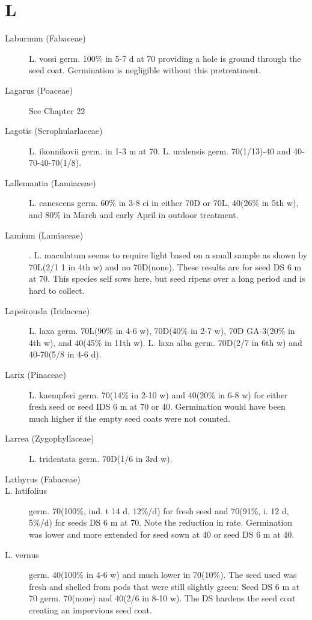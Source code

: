 \section{L}
\begin{description}

\item[Laburnum (Fabaceae)] L. vossi germ. 100\% in 5-7 d at 70 providing a hole
is ground through the seed coat. Germination is negligible without this pretreatment.

\item[Lagarus (Poaceae)] See Chapter 22
\item[Lagotis (Scrophularlaceae)] L. ikonnikovii germ. in 1-3 m at 70. L.
uralensis germ. 70(1/13)-40 and 40-70-40-70(1/8).
\item[Lallemantia (Lamiaceae)] L. canescens germ. 60\% in 3-8 ci in either 70D
or 70L, 40(26\% in 5th w), and 80\% in March and early April in outdoor treatment.
\item[Lamium (Lamiaceae)]. L. maculatum seems to require light based on a
small sample as shown by 70L(2/1 1 in 4th w) and no 70D(none). These results are for
seed DS 6 m at 70. This species self sows here, but seed ripens over a long period
and is hard to collect.
\item[Lapeirousla (Iridaceae)] L. laxa germ. 70L(90\% in 4-6 w), 70D(40\% in 2-7
w), 70D GA-3(20\% in 4th w), and 40(45\% in 11th w). L. laxa alba germ. 70D(2/7 in 6th
w) and 40-70(5/8 in 4-6 d).

\item[Larix (Pinaceae)] L. kaempferi germ. 70(14\% in 2-10 w) and 40(20\% in 6-8
w) for either fresh seed or seed IDS 6 m at 70 or 40. Germination would have been
much higher if the empty seed coats were not counted.
\item[Larrea (Zygophyllaceae)] L. tridentata germ. 70D(1/6 in 3rd w).
\item[Lathyrus (Fabaceae)]
\item[L. latifolius] germ. 70(100\%, ind. t 14 d, 12\%/d) for fresh seed and 70(91\%, i.
12 d, 5\%/d) for seeds DS 6 m at 70. Note the reduction in rate. Germination was
lower and more extended for seed sown at 40 or seed DS 6 m at 40.
\item[L. vernus] germ. 40(100\% in 4-6 w) and much lower in 70(10\%). The seed used
was fresh and shelled from pods that were still slightly green: Seed DS 6 m at 70
germ. 70(none) and 40(2/6 in 8-10 w). The DS hardens the seed coat creating an
impervious seed coat.


\end{description}
